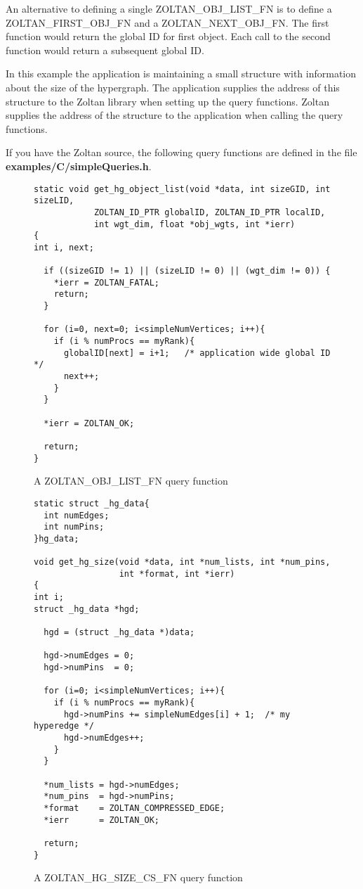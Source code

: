 An alternative to defining a single ZOLTAN\_OBJ\_LIST\_FN is to define
a ZOLTAN\_FIRST\_OBJ\_FN and a ZOLTAN\_NEXT\_OBJ\_FN.  The first function
would return the global ID for first object.  Each call to the second function would
return a subsequent global ID.

In this example the application is maintaining a small structure
with information about the size of the hypergraph.  The application
supplies the address of this structure to the Zoltan library
when setting up the query functions.  Zoltan supplies the address
of the structure to the application when calling the query functions.

If you have the Zoltan source, the following query functions
are defined in the file \textbf{examples/C/simpleQueries.h}.

\begin{figure}
\begin{flushleft}
\begin{verbatim}
static void get_hg_object_list(void *data, int sizeGID, int sizeLID,
            ZOLTAN_ID_PTR globalID, ZOLTAN_ID_PTR localID,
            int wgt_dim, float *obj_wgts, int *ierr)
{
int i, next;

  if ((sizeGID != 1) || (sizeLID != 0) || (wgt_dim != 0)) {
    *ierr = ZOLTAN_FATAL;
    return;
  }

  for (i=0, next=0; i<simpleNumVertices; i++){
    if (i % numProcs == myRank){
      globalID[next] = i+1;   /* application wide global ID */
      next++;
    }
  }

  *ierr = ZOLTAN_OK;

  return;
}
\end{verbatim}
\end{flushleft}
\caption{A ZOLTAN\_OBJ\_LIST\_FN query function}
\label{fig:ObjList2}
\end{figure}

\begin{figure}
\begin{flushleft}
\begin{verbatim}
static struct _hg_data{
  int numEdges;
  int numPins;
}hg_data;

void get_hg_size(void *data, int *num_lists, int *num_pins,
                 int *format, int *ierr)
{
int i;
struct _hg_data *hgd;

  hgd = (struct _hg_data *)data;

  hgd->numEdges = 0;
  hgd->numPins  = 0;

  for (i=0; i<simpleNumVertices; i++){
    if (i % numProcs == myRank){
      hgd->numPins += simpleNumEdges[i] + 1;  /* my hyperedge */
      hgd->numEdges++;
    }
  }

  *num_lists = hgd->numEdges;
  *num_pins  = hgd->numPins;
  *format    = ZOLTAN_COMPRESSED_EDGE;
  *ierr      = ZOLTAN_OK;

  return;
}
\end{verbatim}
\end{flushleft}
\caption{A ZOLTAN\_HG\_SIZE\_CS\_FN query function}
\label{fig:SizeCS}
\end{figure}

